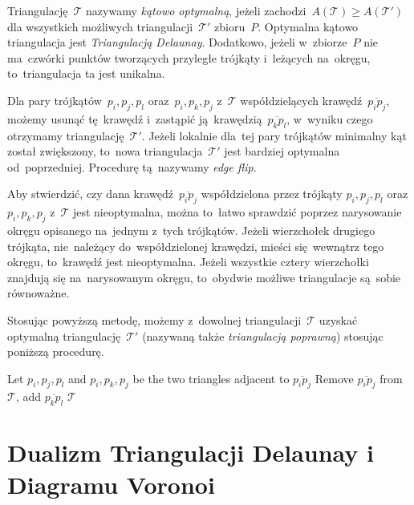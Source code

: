 \documentclass[skorowidz,autorrok,backref,xodstep,oswiadczenie]{wmimgr}
\begin{document}
Triangulację~$\mathcal{T}$ nazywamy \emph{kątowo optymalną}, jeżeli zachodzi~$A(\mathcal{T}) \geq A(\mathcal{T'})$ dla wszystkich możliwych triangulacji~$\mathcal{T'}$ zbioru~$P$. Optymalna kątowo triangulacja jest \emph{Triangulacją Delaunay}. Dodatkowo, jeżeli w~zbiorze~$P$ nie ma~czwórki punktów tworzących przyległe trójkąty i~leżących na~okręgu, to~triangulacja ta jest unikalna.

Dla pary trójkątów~$p_{i}, p_{j}, p_{l}$ oraz~$p_{i}, p_{k}, p_{j}$ z~$\mathcal{T}$ współdzielących krawędź~$\overline{p_{i} p_{j}}$, możemy usunąć tę~krawędź i~zastąpić ją~krawędzią~$\overline{p_{k} p_{l}}$, w~wyniku czego otrzymamy triangulację~$\mathcal{T'}$. Jeżeli lokalnie dla~tej pary trójkątów minimalny kąt został zwiększony, to~nowa triangulacja~$\mathcal{T'}$ jest bardziej optymalna od~poprzedniej. Procedurę tą~nazywamy \emph{edge flip}.

Aby stwierdzić, czy dana krawędź~$\overline{p_{i} p_{j}}$ współdzielona przez trójkąty $p_{i}, p_{j}, p_{l}$ oraz $p_{i}, p_{k}, p_{j}$ z~$\mathcal{T}$ jest nieoptymalna, można to~łatwo sprawdzić poprzez narysowanie okręgu opisanego na~jednym z~tych trójkątów. Jeżeli wierzchołek drugiego trójkąta, nie~należący do~współdzielonej krawędzi, mieści się~wewnątrz tego okręgu, to~krawędź jest nieoptymalna. Jeżeli wszystkie cztery wierzchołki znajdują się na~narysowanym okręgu, to~obydwie możliwe triangulacje są~sobie równoważne.

Stosując powyższą metodę, możemy z~dowolnej triangulacji~$\mathcal{T}$ uzyskać optymalną triangulację~$\mathcal{T'}$ (nazywaną także \emph{triangulacją poprawną}) stosując poniższą procedurę.

\begin{algorithm}
\caption{$LegalTriangulation(\mathcal{T})$ \cite{geometria}}
\label{LegalTriangulation}
\begin{algorithmic}
        \STATE Let $p_{i}, p_{j}, p_{l}$ and $p_{i}, p_{k}, p_{j}$ be the two triangles adjacent to $\overline{p_{i} p_{j}}$
        \STATE Remove $\overline{p_{i} p_{j}}$ from $\mathcal{T}$, add $\overline{p_{k} p_{l}}$
    \ENDWHILE
    \RETURN $\mathcal{T}$
\end{algorithmic}
\end{algorithm}

\section{Dualizm Triangulacji Delaunay i Diagramu Voronoi}
\end{document}
